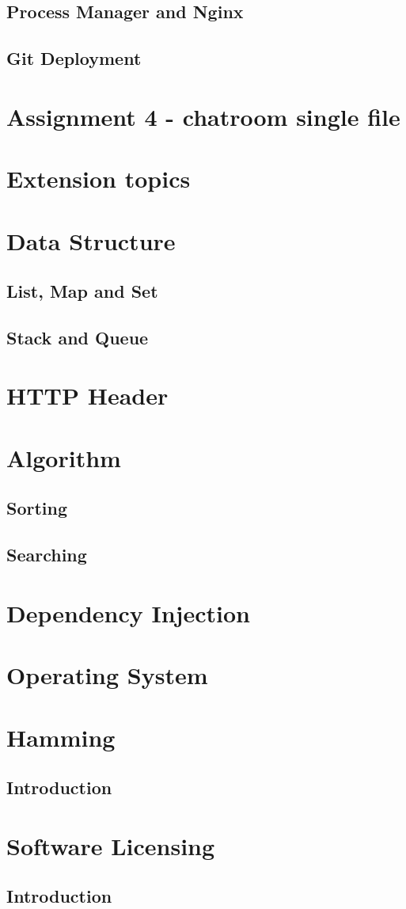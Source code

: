 \documentclass[a4paper]{article}
\begin{document}
\subsection{Process Manager and Nginx}
\subsection{Git Deployment}

\section{Assignment 4 - chatroom single file}

\section{Extension topics}

\section{Data Structure}
\subsection{List, Map and Set}
\subsection{Stack and Queue}

\section{HTTP Header}

\section{Algorithm}
\subsection{Sorting}
\subsection{Searching}

\section{Dependency Injection}

\section{Operating System}

\section{Hamming}
\subsection{Introduction}

\section{Software Licensing}
\subsection{Introduction}
\end{document}
